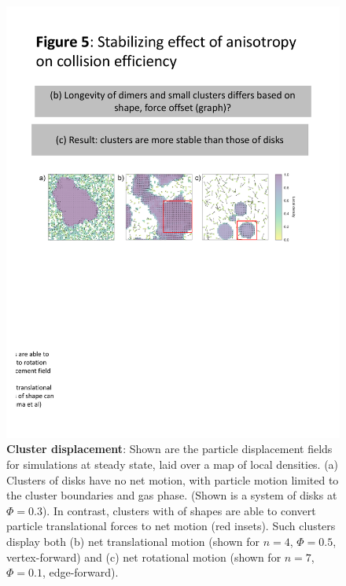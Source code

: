 \vfill
\clearpage



\begin{figure}[!t]
\begin{center}
\includegraphics[width=6in]{../Figures/Fig4.pdf}
\caption{
\textbf{Cluster displacement}:
Shown are the particle displacement fields for simulations at steady state, laid over a map of local densities. 
(a) Clusters of disks have no net motion, with particle motion limited to the cluster boundaries and gas phase.
(Shown is a system of disks at $\Phi=0.3$).
In contrast, clusters with of shapes are able to convert particle translational forces to net motion (red insets).
Such clusters display both
(b) net translational motion (shown for $n=4$, $\Phi=0.5$, vertex-forward) and
(c) net rotational motion (shown for $n=7$, $\Phi=0.1$, edge-forward).
}
\label{fig:velocity}
\end{center}
\end{figure}

